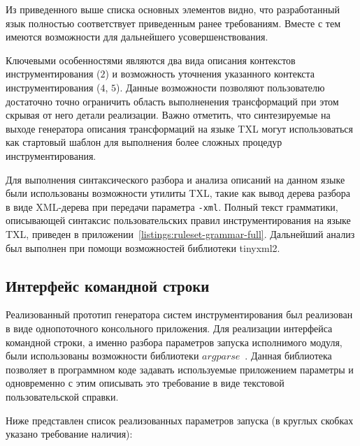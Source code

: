 Из приведенного выше списка основных элементов видно, что разработанный язык полностью соответствует приведенным ранее требованиям.
Вместе с тем имеются возможности для дальнейшего усовершенствования.

Ключевыми особенностями являются два вида описания контекстов инструментирования ($2$) и возможность уточнения указанного контекста инструментирования ($4$, $5$).
Данные возможности позволяют пользователю достаточно точно ограничить область выполненения трансформаций при этом скрывая от него детали реализации.
Важно отметить, что синтезируемые на выходе генератора описания трансформаций на языке TXL могут использоваться как стартовый шаблон для выполнения более сложных процедур инструментирования.

Для выполнения синтаксического разбора и анализа описаний на данном языке были использованы возможности утилиты TXL, такие как вывод дерева разбора в виде XML-дерева при передачи параметра \lstinline{-xml}.
Полный текст грамматики, описывающей синтаксис пользовательских правил инструментирования на языке TXL, приведен в приложении~\ref{listings:ruleset-grammar-full}.
Дальнейший анализ был выполнен при помощи возможностей библиотеки tinyxml2.

\subsection{Интерфейс командной строки}

Реализованный прототип генератора систем инструментирования был реализован в виде однопоточного консольного приложения.
Для реализации интерфейса командной строки, а именно разбора параметров запуска исполнимого модуля, были использованы возможности библиотеки $argparse$~\cite{argparse}.
Данная библиотека позволяет в программном коде задавать используемые приложением параметры и одновременно с этим описывать это требование в виде текстовой пользовательской справки.

Ниже представлен список реализованных параметров запуска (в круглых скобках указано требование наличия):


